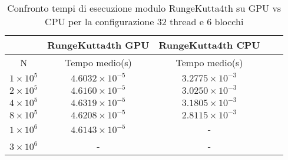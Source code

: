\begin{table}[ht!]
    \begin{center}
        \renewcommand{\arraystretch}{1.5}
        \begin{adjustbox}{width=.51\textwidth}
            \begin{tabular}{ |c|c|c|c|c| }
                \hline
                \multicolumn{1}{|c}{} & \multicolumn{1}{|c}{RungeKutta4th GPU} & \multicolumn{1}{|c|}{RungeKutta4th CPU} \\
                \hline
                N & Tempo medio(s) & Tempo medio(s) \\
                \hline 
                 $1 \times 10^5$ & $4.6032 \times 10^{-5}$ & $3.2775 \times 10^{-3}$ \\ 
                \hline 
                 $2 \times 10^5$ & $4.6160 \times 10^{-5}$ & $3.0250 \times 10^{-3}$ \\ 
                \hline
                 $4 \times 10^5$ & $4.6319 \times 10^{-5}$ & $3.1805 \times 10^{-3}$ \\ 
                \hline 
                 $8 \times 10^5$ & $4.6208 \times 10^{-5}$ & $2.8115 \times 10^{-3}$ \\ 
                \hline 
                 $1 \times 10^6$ & $4.6143 \times 10^{-5}$ & - \\ 
                \hline 
                 $3 \times 10^6$ & - & -  \\ 
                \hline 
            \end{tabular}
        \end{adjustbox}
    \end{center}
    \caption{Confronto tempi di esecuzione modulo RungeKutta4th su GPU vs CPU per la configurazione 32 thread e 6 blocchi}
    \label{tab:rk4_kernel_table_32x6}
\end{table}

